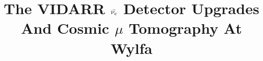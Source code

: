 \usepackage{graphicx}
\graphicspath{{Fig/}}
\usepackage[parfill]{parskip}
\usepackage{rotating}

\title{The VIDARR $\Bar{\nu_e}$ Detector Upgrades And Cosmic $\mu$ Tomography At Wylfa}









     
